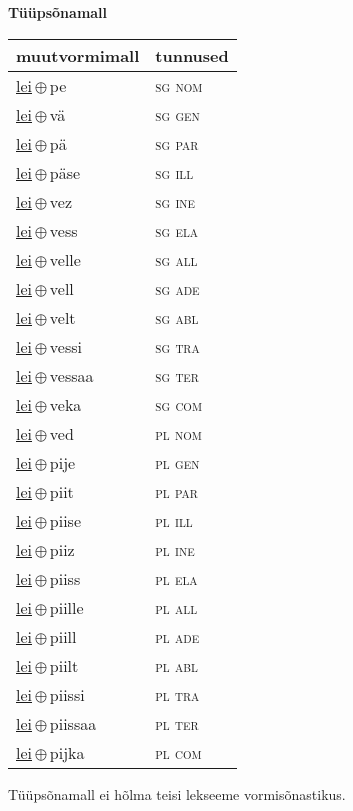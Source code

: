 

\vspace{3.5em}
\noindent \begin{minipage}{\textwidth}
\noindent \textbf{Tüüpsõnamall \,}\\

\begin{sideways}
\begin{tabular}{l l}
muutvormimall & tunnused \\
\hline
\underline{lei}\,$\oplus$\,pe & \textsc{ sg nom } \\
\underline{lei}\,$\oplus$\,vä & \textsc{ sg gen } \\
\underline{lei}\,$\oplus$\,pä & \textsc{ sg par } \\
\underline{lei}\,$\oplus$\,päse & \textsc{ sg ill } \\
\underline{lei}\,$\oplus$\,vez & \textsc{ sg ine } \\
\underline{lei}\,$\oplus$\,vess & \textsc{ sg ela } \\
\underline{lei}\,$\oplus$\,velle & \textsc{ sg all } \\
\underline{lei}\,$\oplus$\,vell & \textsc{ sg ade } \\
\underline{lei}\,$\oplus$\,velt & \textsc{ sg abl } \\
\underline{lei}\,$\oplus$\,vessi & \textsc{ sg tra } \\
\underline{lei}\,$\oplus$\,vessaa & \textsc{ sg ter } \\
\underline{lei}\,$\oplus$\,veka & \textsc{ sg com } \\
\underline{lei}\,$\oplus$\,ved & \textsc{ pl nom } \\
\underline{lei}\,$\oplus$\,pije & \textsc{ pl gen } \\
\underline{lei}\,$\oplus$\,piit & \textsc{ pl par } \\
\underline{lei}\,$\oplus$\,piise & \textsc{ pl ill } \\
\underline{lei}\,$\oplus$\,piiz & \textsc{ pl ine } \\
\underline{lei}\,$\oplus$\,piiss & \textsc{ pl ela } \\
\underline{lei}\,$\oplus$\,piille & \textsc{ pl all } \\
\underline{lei}\,$\oplus$\,piill & \textsc{ pl ade } \\
\underline{lei}\,$\oplus$\,piilt & \textsc{ pl abl } \\
\underline{lei}\,$\oplus$\,piissi & \textsc{ pl tra } \\
\underline{lei}\,$\oplus$\,piissaa & \textsc{ pl ter } \\
\underline{lei}\,$\oplus$\,pijka & \textsc{ pl com } \\
\end{tabular}
\end{sideways}
\label{tab:tüüpsõnamall-leipe}

\end{minipage}

 
\vspace{1em}
\noindent Tüüpsõnamall  ei hõlma teisi lekseeme vormi\-sõnastikus.
